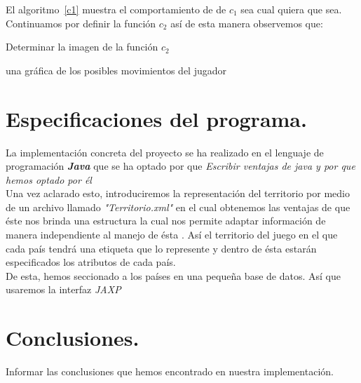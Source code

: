 \documentclass[12pt,twocolumn,draft]{article}
\begin{document}
El algoritmo~\ref{c1} muestra el comportamiento de de $c_{1}$ sea cual quiera que sea.\\

Continuamos por definir la funci\'on $c_{2}$ as\'i de esta manera observemos que:\\

\begin{algorithm}
\begin{algorithmic}[1]
\ENSURE Determinar la imagen de la funci\'on $c_{2}$
\ENDIF
\ENDFOR
\end{algorithmic}
\caption{Definici\'on de la funci\'on $c_{2}$}
\label{c2}
\end{algorithm}



\begin{algorithm}
\begin{algorithmic}[1]
\ENSURE una gr\'afica de los posibles movimientos del jugador
\ELSE 
{}
\ENDIF
\ENDFOR
\end{algorithmic}
\caption{Genera los posibles movimientos del jugador}
\label{c3}
\end{algorithm}


\section{Especificaciones del programa.}

La implementaci\'on concreta del proyecto se ha realizado en el lenguaje de programaci\'on \textbf{\textit{Java}}\cite{JAVA} que se ha optado por que \textit{Escribir ventajas de java y por que hemos optado por \'el}\\

Una vez aclarado esto, introduciremos la representaci\'on del territorio por medio de un archivo llamado \textit{"Territorio.xml"} en el cual obtenemos las ventajas de que \'este nos brinda una estructura la cual nos permite adaptar informaci\'on de manera independiente al manejo de \'esta \cite{xml}. As\'i el territorio del juego en el que cada pa\'is tendr\'a una etiqueta que lo represente y dentro de \'esta estar\'an especificados los atributos de cada pa\'is.\\

De esta, hemos seccionado a los pa\'ises en una pequeña base de datos. As\'i que usaremos la interfaz \textit{JAXP}\cite{JAXP}

\section{Conclusiones.}
Informar las conclusiones que hemos encontrado en nuestra implementaci\'on.\\


\newpage
	
{}
\end{document}
